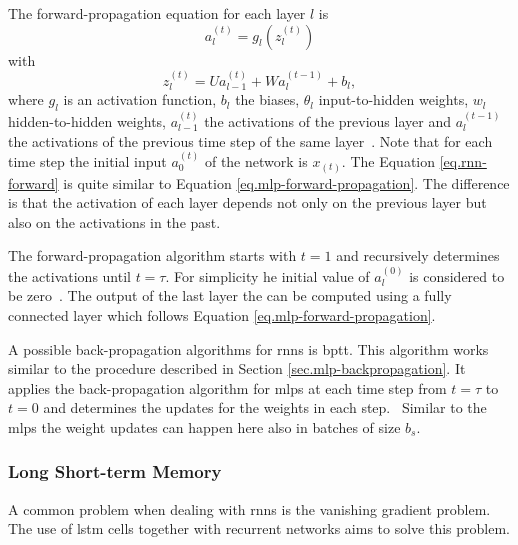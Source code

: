 The forward-propagation equation for each layer $l$ is
\begin{equation}
	a^{(t)}_l=g_l(z^{(t)}_l)
	\label{eq.rnn-forward}
\end{equation}
with
\begin{equation}
	z^{(t)}_l=U a^{(t)}_{l-1} + W a^{(t-1)}_l + b_l,
\end{equation}
where $g_l$ is an activation function, $b_l$ the biases, $\theta_l$ input-to-hidden weights, $w_l$ hidden-to-hidden weights, $a^{(t)}_{l-1}$ the activations of the previous layer and $a^{(t-1)}_l$ the activations of the previous time step of the same layer~\cite[p.~370]{Goodfellow2016}.
Note that for each time step the initial input $a^{(t)}_0$ of the network is $x_{(t)}$.
The Equation \ref{eq.rnn-forward} is quite similar to Equation \ref{eq.mlp-forward-propagation}. The difference is that the activation of each layer depends not only on the previous layer but also on the activations in the past.

The forward-propagation algorithm starts with $t=1$ and recursively determines the activations until $t=\tau$. For simplicity he initial value of $a^{(0)}_l$ is considered to be zero~\cite[p.~23]{Graves2012}.
The output of the last layer the can be computed using a fully connected layer which follows Equation \ref{eq.mlp-forward-propagation}.

A possible back-propagation algorithms for \glspl{rnn} is \gls{bptt}. This algorithm works similar to the procedure described in Section \ref{sec.mlp-backpropagation}. It applies the back-propagation algorithm for \glspl{mlp} at each time step from $t=\tau$ to $t=0$ and determines the updates for the weights in each step.~\cite[p.~450]{Williams1995}
Similar to the \glspl{mlp} the weight updates can happen here also in batches of size $b_s$.

\subsubsection{Long Short-term Memory}\label{sec.lstm}

A common problem when dealing with \glspl{rnn} is the vanishing gradient problem. The use of \gls{lstm} cells together with recurrent networks aims to solve this problem.

